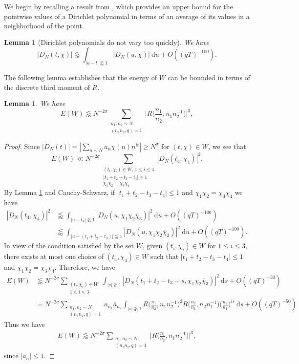 \documentclass[12pt]{amsart}
\newtheorem{lemma}[theorem]{Lemma}
\theoremstyle{definition}
\theoremstyle{plain}
\theoremstyle{remark}
\numberwithin{equation}{section}
\numberwithin{theorem}{section}
\numberwithin{equation}{section}
\begin{document}
	We begin by recalling a result from \cite[Lemma 11.3]{GM}, which provides an upper bound for the pointwise values of a Dirichlet polynomial in terms of an average of its values in a neighborhood of the point.
	\begin{lemma}[Dirichlet polynomials do not vary too quickly]\label{Dpdnvf} 
		We have 
		\[|D_{N}(t, \chi)|\lessapprox \int_{|u-t|\lessapprox 1}|D_{N}(u, \chi)| \:\mathrm{d}u+O((qT)^{-100}).\]
	\end{lemma}
	
	The following lemma establishes that the energy of $W$ can be bounded in terms of the discrete third moment of $R$.
	\begin{lemma}\label{econ3}
		We have 
		\[E(W)\lessapprox N^{-2\sigma}\sum_{\substack{n_1,n_2\sim N \\  (n_1n_2, q)=1}}\bigg|R\bigg(\frac{n_{1}}{n_{2}}, n_{1}n_{2}^{-1}\bigg)\bigg|^{3},\]
	\end{lemma}
	\begin{proof}
		Since $|D_N(t)|=|\sum_{n \sim N} a_{n}\chi(n)n^{it}| \geq N^{\sigma}$ for $(t, \chi) \in W$, we see that
		\[E(W) \ll N^{-2\sigma}\sum_{\substack{(t_{i}, \chi_{i})\in W, \, 1\leq i \leq 4 \\ |t_{1}+t_{2}-t_{3}-t_{4}|\leq 1 \\ \chi_{1}\chi_{2}=\chi_{3}\chi_{4}}}|D_{N}(t_{4}, \chi_{4})|^{2}.\]
		By Lemma \ref{Dpdnvf} and Cauchy-Schwarz, if $|t_{1}+t_{2}-t_{3}-t_{4}|\leq 1$ and $\chi_{1}\chi_{2}=\chi_{3}\chi_{4}$ we have
		\begin{align*}
			|D_{N}(t_{4}, \chi_{4})|^{2} &\lessapprox \int_{|u-t_{4}|\lessapprox 1}|D_{N}(u, \chi_{1}\chi_{2}\overline{\chi}_{3})|^{2} \:\mathrm{d}u+O((qT)^{-100}) 
			\\
			&\lessapprox \int_{|u-(t_{1}+t_{2}-t_{3})|\lessapprox 1}|D_{N}(u, \chi_{1}\chi_{2}\overline{\chi}_{3})|^{2} \:\mathrm{d}u+O((qT)^{-100}).
		\end{align*}
		In view of the condition satisfied by the set $W$, given $(t_{i}, \chi_{i})\in W$ for $1\leq i \leq 3$, there exists at most one choice of $(t_{4}, \chi_{4}) \in W$ such that $|t_{1}+t_{2}-t_{3}-t_{4}|\leq 1$ and $\chi_{1}\chi_{2}=\chi_{3}\chi_{4}$. Therefore, we have
		\begin{align*}
			E(W) &\lessapprox N^{-2\sigma}\sum_{\substack{(t_{i}, \chi_{i})\in W \\ 1\leq i \leq 3}}\int_{|s|\lessapprox 1}|D_{N}(t_{1}+t_{2}-t_{3}-s, \chi_{1}\chi_{2}\overline{\chi}_{3})|^{2} \:\mathrm{d}s+O((qT)^{-50})
			\\
			&=N^{-2\sigma}\sum_{\substack{n_1,n_2 \sim N \\ (n_1n_2,q)=1}}a_{n_{1}}\overline{a}_{n_{2}}\int_{|s|\lessapprox 1}R\bigg(\frac{n_{1}}{n_{2}}, n_{1}n_{2}^{-1}\bigg)^{2}R\bigg(\frac{n_{2}}{n_{1}}, n_{2}n_{1}^{-1}\bigg)\bigg(\frac{n_{2}}{n_{1}}\bigg)^{is}  \:\mathrm{d}s+O((qT)^{-50})
		\end{align*}
		Thus we have
		\begin{align*}
			E(W)\lessapprox N^{-2\sigma}\sum_{\substack{n_1,n_2 \sim N, \\ (n_1n_2, q)=1}}\bigg|R\bigg(\frac{n_{1}}{n_{2}}, n_{1}n_{2}^{-1}\bigg)\bigg|^{3},
		\end{align*}
		since $|a_n| \leq 1$.
	\end{proof}
\end{document}
